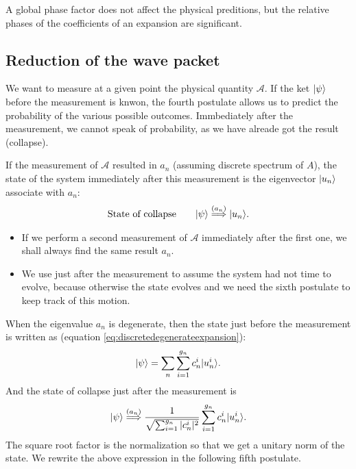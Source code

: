 \begin{emphasizer}
    A global phase factor does not affect the physical preditions, but the relative phases of the coefficients of an expansion are significant.
\end{emphasizer}

%
\subsection{Reduction of the wave packet}
We want to measure at a given point the physical quantity $\mathcal{A}$. If the ket $|\psi\rangle$ before the measurement is knwon, the fourth postulate
allows us to predict the probability of the various possible outcomes. Immbediately after the measurement, we cannot speak of probability, as we have 
alreade got the result (collapse).

If the measurement of $\mathcal{A}$ resulted in $a_n$ (assuming discrete spectrum of $A$), the state of the system immediately after this measurement is the eigenvector $|u_n\rangle$ associate with $a_n$:
\begin{align}
    \text{State of collapse}\qquad|\psi\rangle\stackrel{(a_n)}{\Longrightarrow}|u_n\rangle.
\end{align}
\begin{itemize}[itemsep=0pt,topsep=0pt]
    \item If we perform a second measurement of $\mathcal{A}$ immediately after the first one, we shall always find the same result $a_n$.
    \item We use just after the measurement to assume the system had not time to evolve, because otherwise the state evolves and we need the sixth postulate to keep track of this motion.
\end{itemize}

When the eigenvalue $a_n$ is degenerate, then the state just before the measurement is written as (equation \eqref{eq:discretedegenerateexpansion}):
\begin{align*}
    |\psi\rangle=\sum_n\sum_{i=1}^{g_n}c_n^i|u_n^i\rangle.
\end{align*}
And the state of collapse just after the measurement is 
\begin{align}
    \displaystyle|\psi\rangle\stackrel{(a_n)}{\Longrightarrow}\frac{1}{\sqrt{\sum_{i=1}^{g_n}|c_n^i|^2}}\sum_{i=1}^{g_n}c_n^i|u_n^i\rangle.
\end{align}
The square root factor is the normalization so that we get a unitary norm of the state. We rewrite the above expression in the following fifth postulate.

